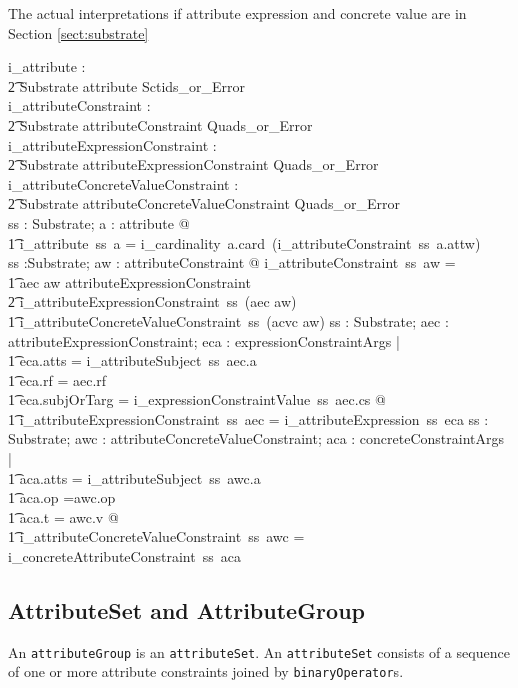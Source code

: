 \documentclass{article}
\def\spec#1{{\tt #1}}
\begin{document}
The actual interpretations if attribute expression and concrete value are in Section \ref{sect:substrate}
\begin{gendef}
   i\_attribute : \\
\t2 Substrate \pfun attribute \pfun Sctids\_or\_Error \\
   i\_attributeConstraint : \\
\t2 Substrate \pfun attributeConstraint \pfun Quads\_or\_Error \\
   i\_attributeExpressionConstraint : \\
\t2 Substrate \pfun attributeExpressionConstraint \pfun Quads\_or\_Error \\
   i\_attributeConcreteValueConstraint : \\
\t2 Substrate \pfun attributeConcreteValueConstraint \pfun Quads\_or\_Error \\
\where
\forall ss : Substrate; a : attribute @ \\
\t1 i\_attribute~ss~a =  i\_cardinality~a.card~(i\_attributeConstraint~ss~a.attw) \\
\also
\forall ss :Substrate; aw : attributeConstraint @ i\_attributeConstraint~ss~aw = \\
\t1 \IF aec \inv aw \in attributeExpressionConstraint \\
\t2  \THEN i\_attributeExpressionConstraint~ss~(aec \inv aw) \\
\t1 \ELSE  i\_attributeConcreteValueConstraint~ss~(acvc \inv aw) 
 \also
\forall ss : Substrate; aec : attributeExpressionConstraint; eca : expressionConstraintArgs | \\
\t1 eca.atts = i\_attributeSubject~ss~aec.a \land \\
\t1 eca.rf = aec.rf \land \\
\t1 eca.subjOrTarg = i\_expressionConstraintValue~ss~aec.cs @ \\
\t1 i\_attributeExpressionConstraint~ss~aec = i\_attributeExpression~ss~eca
\also 
\forall ss : Substrate; awc : attributeConcreteValueConstraint; aca : concreteConstraintArgs | \\
\t1 aca.atts = i\_attributeSubject~ss~awc.a \land \\
\t1 aca.op =awc.op \land \\
\t1 aca.t = awc.v @ \\
\t1 i\_attributeConcreteValueConstraint~ss~awc = i\_concreteAttributeConstraint~ss~aca \\
\end{gendef}

\subsection{AttributeSet and AttributeGroup}
An \spec{attributeGroup} is an \spec{attributeSet}.  An \spec{attributeSet} consists of a sequence of one or more attribute constraints joined by \spec{binaryOperator}s.
\end{document}
